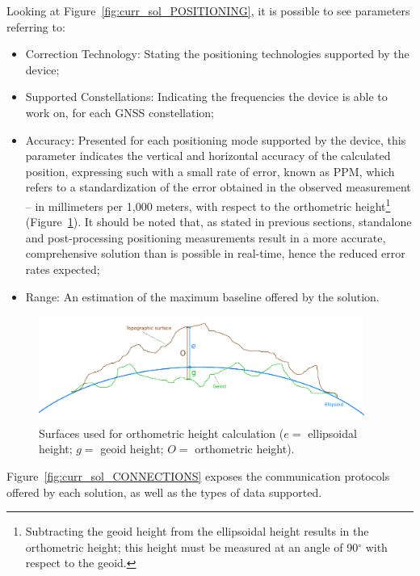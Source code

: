 Looking at Figure~\ref{fig:curr_sol_POSITIONING}, it is possible to see parameters referring to:
\begin{itemize}
    \item Correction Technology: Stating the positioning technologies supported by the device;
    \item Supported Constellations: Indicating the frequencies the device is able to work on, for each GNSS constellation;
    \item Accuracy: Presented for each positioning mode supported by the device, this parameter indicates the vertical and horizontal accuracy of the calculated position, expressing such with a small rate of error, known as PPM, which refers to a standardization of the error obtained in the observed measurement -- in millimeters per 1,000 meters, with respect to the orthometric height\footnote{Subtracting the geoid height from the ellipsoidal height results in the orthometric height; this height must be measured at an angle of 90$^{\circ}$ with respect to the \gls{geoid}.} (Figure~\ref{fig:orthometric_height}). It should be noted that, as stated in previous sections, standalone and post-processing positioning measurements result in a more accurate, comprehensive solution than is possible in real-time, hence the reduced error rates expected;
    \item Range: An estimation of the maximum baseline offered by the solution.
\end{itemize}
\begin{figure}[h]
    \centering
    \includegraphics[width=0.95\textwidth]{Chapters/Figures/orthometric_height.pdf}
    \caption{Surfaces used for orthometric height calculation ($e=$ ellipsoidal height; $g=$ geoid height; $O=$ orthometric height).}
    \label{fig:orthometric_height}
\end{figure}

Figure~\ref{fig:curr_sol_CONNECTIONS} exposes the communication protocols offered by each solution, as well as the types of data supported.

